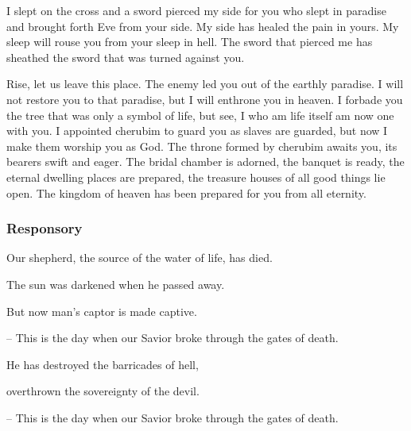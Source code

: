 I slept on the cross and a sword pierced my side for you who slept in paradise and brought forth Eve from your side. My side has healed the pain in yours. My sleep will rouse you from your sleep in hell. The sword that pierced me has sheathed the sword that was turned against you.

Rise, let us leave this place. The enemy led you out of the earthly paradise. I will not restore you to that paradise, but I will enthrone you in heaven. I forbade you the tree that was only a symbol of life, but see, I who am life itself am now one with you. I appointed cherubim to guard you as slaves are guarded, but now I make them worship you as God. The throne formed by cherubim awaits you, its bearers swift and eager. The bridal chamber is adorned, the banquet is ready, the eternal dwelling places are prepared, the treasure houses of all good things lie open. The kingdom of heaven has been prepared for you from all eternity.

\subsubsection{Responsory}

\hfill 

Our shepherd, the source of the water of life, has died.\par
The sun was darkened when he passed away.\par
But now man’s captor is made captive.\par
– This is the day when our Savior broke through the gates of death.

\vspace{5pt}

He has destroyed the barricades of hell,\par
overthrown the sovereignty of the devil.\par
– This is the day when our Savior broke through the gates of death.
